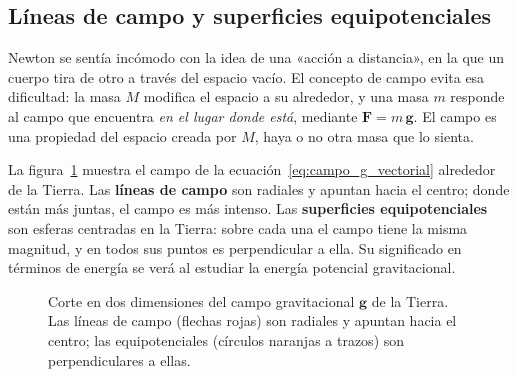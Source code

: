
\subsection{Líneas de campo y superficies equipotenciales}
\label{subsec:lineas_equipotenciales}

Newton se sentía incómodo con la idea de una «acción a distancia», en la
que un cuerpo tira de otro a través del espacio vacío. El concepto de campo
evita esa dificultad: la masa $M$ modifica el espacio a su alrededor, y una
masa $m$ responde al campo que encuentra \emph{en el lugar donde está},
mediante $\boldsymbol{F} = m\,\boldsymbol{g}$. El campo es una propiedad del
espacio creada por $M$, haya o no otra masa que lo sienta.

La figura~\ref{fig:campo_gravitacional_newton} muestra el campo de la
ecuación~\eqref{eq:campo_g_vectorial} alrededor de la Tierra. Las
\textbf{líneas de campo} son radiales y apuntan hacia el centro; donde están
más juntas, el campo es más intenso. Las \textbf{superficies equipotenciales}
son esferas centradas en la Tierra: sobre cada una el campo tiene la misma
magnitud, y en todos sus puntos es perpendicular a ella. Su significado en
términos de energía se verá al estudiar la energía potencial gravitacional.

\begin{figure}[htbp]
  \centering
  \caption{Corte en dos dimensiones del campo gravitacional $\boldsymbol{g}$
    de la Tierra. Las líneas de campo (flechas rojas) son radiales y apuntan
    hacia el centro; las equipotenciales (círculos naranjas a trazos) son
    perpendiculares a ellas.}
  \label{fig:campo_gravitacional_newton}
\end{figure}

